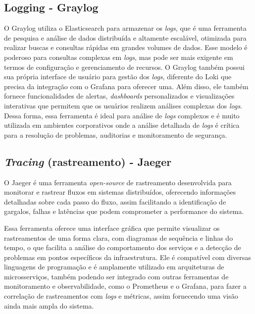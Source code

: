 \subsection{Logging - Graylog}
O Graylog utiliza o Elasticsearch para armazenar os \emph{logs}, que é uma ferramenta de pesquisa e análise de dados distribuída e altamente escalável, otimizada para realizar buscas e consultas rápidas em grandes volumes de dados. Esse modelo é poderoso para consultas complexas em \emph{logs}, mas pode ser mais exigente em termos de configuração e gerenciamento de recursos. O Graylog também possui sua própria interface de usuário para gestão dos \emph{logs}, diferente do Loki que precisa da integração com o Grafana para oferecer uma. Além disso, ele também fornece funcionalidades de alertas, \emph{dashboards} personalizados e visualizações interativas que permitem que os usuários realizem análises complexas dos \emph{logs}. Dessa forma, essa ferramenta é ideal para análise de \emph{logs} complexos e é muito utilizada em ambientes corporativos onde a análise detalhada de \emph{logs} é crítica para a resolução de problemas, auditorias e monitoramento de segurança. \cite{graylog}

\subsection{\emph{Tracing} (rastreamento) - Jaeger}
O Jaeger é uma ferramenta \emph{open-source} de rastreamento desenvolvida para monitorar e rastrear fluxos em sistemas distribuídos, oferecendo informações detalhadas sobre cada passo do fluxo, assim facilitando a identificação de gargalos, falhas e latências que podem comprometer a performance do sistema. \cite{jaeger}

Essa ferramenta oferece uma interface gráfica que permite visualizar os rastreamentos de uma forma clara, com diagramas de sequência e linhas do tempo, o que facilita a análise do comportamento dos serviços e a detecção de problemas em pontos específicos da infraestrutura. Ele é compatível com diversas linguagens de programação e é amplamente utilizado em arquiteturas de microsserviços, também podendo ser integrado com outras ferramentas de monitoramento e observabilidade, como o Prometheus e o Grafana, para fazer a correlação de rastreamentos com \emph{logs} e métricas, assim fornecendo uma visão ainda mais ampla do sistema. \cite{jaeger}
  
